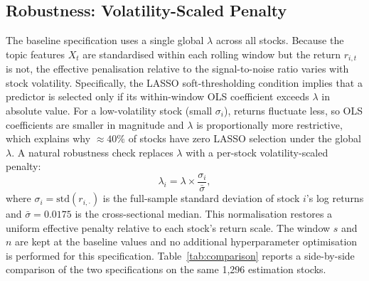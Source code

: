 \documentclass[11pt]{article}
\begin{document}
\subsection{Robustness: Volatility-Scaled Penalty}

The baseline specification uses a single global $\lambda$ across all stocks.
Because the topic features $X_t$ are standardised within each rolling window but the
return $r_{i,t}$ is not, the effective penalisation relative to the signal-to-noise
ratio varies with stock volatility.
Specifically, the LASSO soft-thresholding condition implies that a predictor is selected
only if its within-window OLS coefficient exceeds $\lambda$ in absolute value.
For a low-volatility stock (small $\sigma_i$), returns fluctuate less, so OLS coefficients
are smaller in magnitude and $\lambda$ is proportionally more restrictive, which explains
why $\approx 40\%$ of stocks have zero LASSO selection under the global $\lambda$.
A natural robustness check replaces $\lambda$ with a per-stock volatility-scaled penalty:
\begin{equation}\label{eq:volscaled_lambda}
\lambda_i = \lambda \times \frac{\sigma_i}{\bar\sigma},
\end{equation}
where $\sigma_i = \mathrm{std}(r_{i,\cdot})$ is the full-sample standard deviation of stock $i$'s
log returns and $\bar\sigma = 0.0175$ is the cross-sectional median.
This normalisation restores a uniform effective penalty relative to each stock's return scale.
The window $s$ and $n$ are kept at the baseline values and no additional hyperparameter
optimisation is performed for this specification.
Table~\ref{tab:comparison} reports a side-by-side comparison of the two specifications on the
same 1,296 estimation stocks.
 
\end{document}
